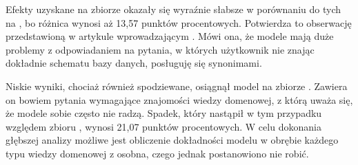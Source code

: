 Efekty uzyskane na zbiorze  okazały się wyraźnie słabsze w porównaniu do tych na , bo różnica wynosi aż 13,57 punktów procentowych. Potwierdza to obserwację przedstawioną w artykule wprowadzającym . Mówi ona, że modele mają duże problemy z odpowiadaniem na pytania, w których użytkownik nie znając dokładnie schematu bazy danych, posługuję się synonimami.

Niskie wyniki, chociaż również spodziewane, osiągnął model na zbiorze . Zawiera on bowiem pytania wymagające znajomości wiedzy domenowej, z którą uważa się, że modele sobie często nie radzą. Spadek, który nastąpił w tym przypadku względem zbioru , wynosi 21,07 punktów procentowych. W celu dokonania głębszej analizy możliwe jest obliczenie dokładności modelu w obrębie każdego typu wiedzy domenowej z osobna, czego jednak postanowiono nie robić.